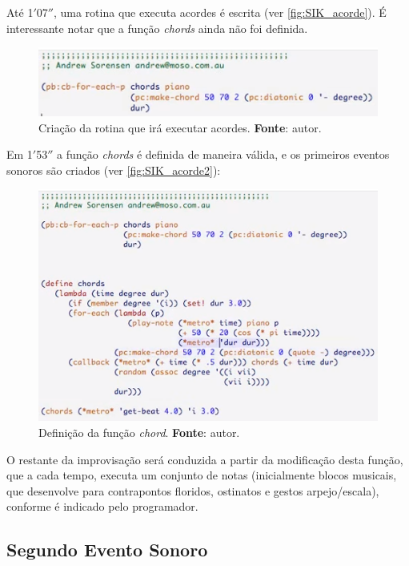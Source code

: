 Até 1$'$07$''$, uma rotina que executa acordes é escrita (ver \autoref{fig:SIK_acorde}). É interessante notar que a função \emph{chords} ainda não foi definida.

\begin{figure}[!h]
  \centering
  \includegraphics[scale=0.7]{imagens/SIK_chord.png}
  \caption{Criação da rotina que irá executar acordes. \textbf{Fonte}: autor.}
  \label{fig:SIK_acorde}
\end{figure}

Em 1$'$53$''$ a função \emph{chords} é definida de maneira válida, e os primeiros eventos sonoros são criados (ver \autoref{fig:SIK_acorde2}):

\begin{figure}[!h]
  \centering
  \includegraphics[scale=0.7]{imagens/SIK_chord2.png}
  \caption{Definição da função \emph{chord}. \textbf{Fonte}: autor.}
  \label{fig:SIK_acorde2}
\end{figure}

O restante da improvisação será conduzida a partir da modificação desta função, que a cada tempo, executa um conjunto de notas (inicialmente blocos musicais, que desenvolve para contrapontos floridos, ostinatos e gestos  arpejo/escala), conforme é indicado pelo programador.


\subsection{Segundo Evento Sonoro}\label{sec:segundoevento}

